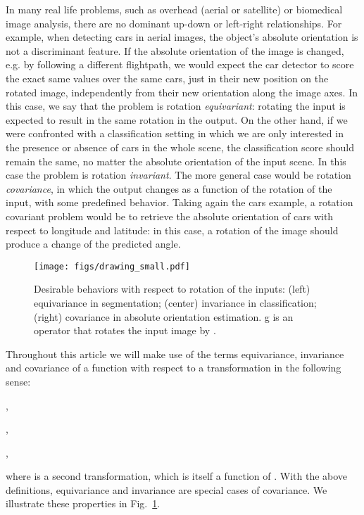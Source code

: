 \documentclass[10pt,twocolumn,letterpaper,table]{article}
\begin{document}
In many real life problems, such as overhead (aerial or satellite) or biomedical image analysis, there are no dominant up-down or left-right relationships. For example, when detecting cars in aerial images, the object's absolute orientation is not a discriminant feature. If the absolute orientation of the image is changed, e.g. by following a different flightpath, we would expect the car detector to score the exact same values over the same cars, just in their new position on the rotated image, independently from their new orientation along the image axes. In this case, we say that the problem is rotation \emph{equivariant}: rotating the input is expected to result in the same rotation in the output. On the other hand, if we were confronted with a classification setting in which we are only interested in the presence or absence of cars in the whole scene, the classification score should remain the same, no matter the absolute orientation of the input scene. In this case the problem is rotation \emph{invariant}. The more general case would be rotation \emph{covariance}, in which the output changes as a function of the rotation of the input, with some predefined behavior. Taking again the cars example, a rotation covariant problem would be to retrieve the absolute orientation of cars with respect to longitude and latitude: in this case, a rotation of the image should produce a change of the predicted angle. 

\begin{figure}[!t]
\centering
\texttt{[image: figs/drawing\_small.pdf]}
\vspace*{-0mm}
\caption{Desirable behaviors with respect to rotation of the inputs: (left) equivariance in segmentation; (center) invariance in classification; (right) covariance in absolute orientation estimation. g is an operator that rotates the input image by . }
\label{fig:equi}
\vspace*{-4mm}
\end{figure}
	
Throughout this article we will make use of the terms equivariance, invariance and covariance of a function  with respect to a transformation  in the following sense:
\begin{description}[noitemsep]
\setlength\itemsep{0.2mm}
\item[\ \  - equivariance:] ,
\item[\ \  - invariance:] ,
\item[\ \  - covariance:] ,
\end{description}
where  is a second transformation, which is itself a function of . With the above definitions, equivariance and invariance are special cases of covariance. We illustrate these properties in Fig.~\ref{fig:equi}.
\end{document}
